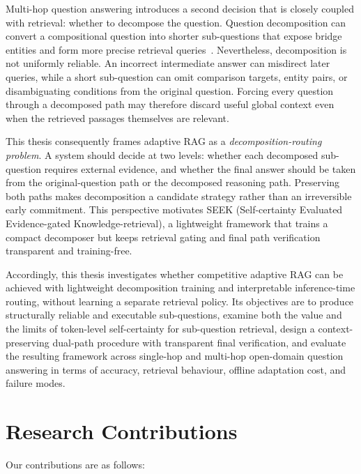 Multi-hop question answering introduces a second decision that is closely coupled with retrieval: whether to decompose the question. Question decomposition can convert a compositional question into shorter sub-questions that expose bridge entities and form more precise retrieval queries~\cite{decomprc,break_qdmr}. Nevertheless, decomposition is not uniformly reliable. An incorrect intermediate answer can misdirect later queries, while a short sub-question can omit comparison targets, entity pairs, or disambiguating conditions from the original question. Forcing every question through a decomposed path may therefore discard useful global context even when the retrieved passages themselves are relevant.

This thesis consequently frames adaptive RAG as a \emph{decomposition-routing problem}. A system should decide at two levels: whether each decomposed sub-question requires external evidence, and whether the final answer should be taken from the original-question path or the decomposed reasoning path. Preserving both paths makes decomposition a candidate strategy rather than an irreversible early commitment. This perspective motivates SEEK (Self-certainty Evaluated Evidence-gated Knowledge-retrieval), a lightweight framework that trains a compact decomposer but keeps retrieval gating and final path verification transparent and training-free.

Accordingly, this thesis investigates whether competitive adaptive RAG can be achieved with lightweight decomposition training and interpretable inference-time routing, without learning a separate retrieval policy. Its objectives are to produce structurally reliable and executable sub-questions, examine both the value and the limits of token-level self-certainty for sub-question retrieval, design a context-preserving dual-path procedure with transparent final verification, and evaluate the resulting framework across single-hop and multi-hop open-domain question answering in terms of accuracy, retrieval behaviour, offline adaptation cost, and failure modes.

\section{Research Contributions}

Our contributions are as follows:

